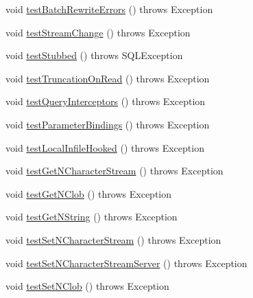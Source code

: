 \begin{DoxyCompactItemize}
\item 
void \mbox{\hyperlink{classtestsuite_1_1simple_1_1_statements_test_a104f5db994108a1a798fde9e3f86761f}{test\+Batch\+Rewrite\+Errors}} ()  throws Exception 
\item 
void \mbox{\hyperlink{classtestsuite_1_1simple_1_1_statements_test_a732ef94880943b2889d9880a0e059b95}{test\+Stream\+Change}} ()  throws Exception 
\item 
void \mbox{\hyperlink{classtestsuite_1_1simple_1_1_statements_test_a10f714e4bdd7ad759e21c30eb9506e1c}{test\+Stubbed}} ()  throws S\+Q\+L\+Exception 
\item 
void \mbox{\hyperlink{classtestsuite_1_1simple_1_1_statements_test_ab2e30242ecd0aa65f25500827a73bfbe}{test\+Truncation\+On\+Read}} ()  throws Exception 
\item 
void \mbox{\hyperlink{classtestsuite_1_1simple_1_1_statements_test_ae7252e52fc20d0db0a50c625214014c5}{test\+Query\+Interceptors}} ()  throws Exception 
\item 
void \mbox{\hyperlink{classtestsuite_1_1simple_1_1_statements_test_a3f282768eb4af0908972bed3c8ee8b94}{test\+Parameter\+Bindings}} ()  throws Exception 
\item 
void \mbox{\hyperlink{classtestsuite_1_1simple_1_1_statements_test_a13a9b6c6aa50b52915b0476c28976c10}{test\+Local\+Infile\+Hooked}} ()  throws Exception 
\item 
void \mbox{\hyperlink{classtestsuite_1_1simple_1_1_statements_test_a53d8b06c4026d32f528f16fd1284b7ba}{test\+Get\+N\+Character\+Stream}} ()  throws Exception 
\item 
void \mbox{\hyperlink{classtestsuite_1_1simple_1_1_statements_test_a536b53923bd42d63d56f1105e13def2a}{test\+Get\+N\+Clob}} ()  throws Exception 
\item 
void \mbox{\hyperlink{classtestsuite_1_1simple_1_1_statements_test_a3901a8c1dff89f3d0ef056153855d1ed}{test\+Get\+N\+String}} ()  throws Exception 
\item 
void \mbox{\hyperlink{classtestsuite_1_1simple_1_1_statements_test_a38e65d199b2dae7aa98098c0c7c3424f}{test\+Set\+N\+Character\+Stream}} ()  throws Exception 
\item 
void \mbox{\hyperlink{classtestsuite_1_1simple_1_1_statements_test_ad1250f33b64cf0554fc2a5e779878e01}{test\+Set\+N\+Character\+Stream\+Server}} ()  throws Exception 
\item 
void \mbox{\hyperlink{classtestsuite_1_1simple_1_1_statements_test_a31aad5a1989e2b9189e57c75eea14e52}{test\+Set\+N\+Clob}} ()  throws Exception 
\item 

\end{DoxyCompactItemize}
